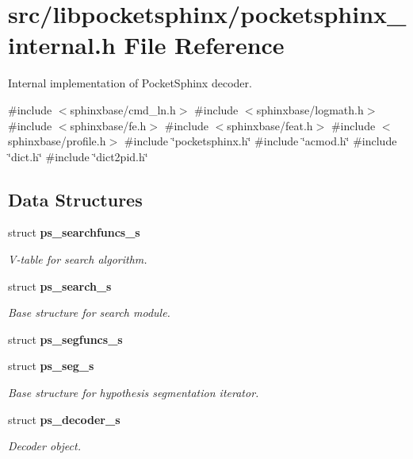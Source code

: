 \section{src/libpocketsphinx/pocketsphinx\-\_\-internal.h \-File \-Reference}
\label{pocketsphinx__internal_8h}


\-Internal implementation of \-Pocket\-Sphinx decoder.  


{\ttfamily \#include $<$sphinxbase/cmd\-\_\-ln.\-h$>$}\*
{\ttfamily \#include $<$sphinxbase/logmath.\-h$>$}\*
{\ttfamily \#include $<$sphinxbase/fe.\-h$>$}\*
{\ttfamily \#include $<$sphinxbase/feat.\-h$>$}\*
{\ttfamily \#include $<$sphinxbase/profile.\-h$>$}\*
{\ttfamily \#include \char`\"{}pocketsphinx.\-h\char`\"{}}\*
{\ttfamily \#include \char`\"{}acmod.\-h\char`\"{}}\*
{\ttfamily \#include \char`\"{}dict.\-h\char`\"{}}\*
{\ttfamily \#include \char`\"{}dict2pid.\-h\char`\"{}}\*
\subsection*{\-Data \-Structures}
\begin{DoxyCompactItemize}
\item 
struct {\bf ps\-\_\-searchfuncs\-\_\-s}
\begin{DoxyCompactList}\small\item\em \-V-\/table for search algorithm. \end{DoxyCompactList}\item 
struct {\bf ps\-\_\-search\-\_\-s}
\begin{DoxyCompactList}\small\item\em \-Base structure for search module. \end{DoxyCompactList}\item 
struct {\bf ps\-\_\-segfuncs\-\_\-s}
\item 
struct {\bf ps\-\_\-seg\-\_\-s}
\begin{DoxyCompactList}\small\item\em \-Base structure for hypothesis segmentation iterator. \end{DoxyCompactList}\item 
struct {\bf ps\-\_\-decoder\-\_\-s}
\begin{DoxyCompactList}\small\item\em \-Decoder object. \end{DoxyCompactList}\end{DoxyCompactItemize}
